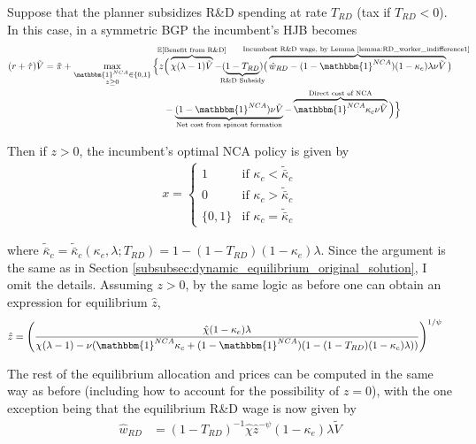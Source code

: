 \documentclass[11pt,english]{article}
\theoremstyle{definition}
\begin{document}
Suppose that the planner subsidizes R\&D spending at rate $T_{RD}$ (tax if $T_{RD} < 0$). In this case, in a symmetric BGP the incumbent's HJB becomes
\begin{align}
(r + \hat{\tau}) \tilde{V} = \tilde{\pi} + \max_{\substack{\mathbbm{1}^{NCA} \in \{0,1\} \\ z \ge 0}} \Big\{z &\Big( \overbrace{\chi (\lambda - 1) \tilde{V}}^{\mathclap{\mathbb{E}[\textrm{Benefit from R\&D}]}}- (\underbrace{1-T_{RD}}_{\mathclap{\text{R\&D Subsidy}}}) \big( \overbrace{\hat{w}_{RD} - (1-\mathbbm{1}^{NCA})(1-\kappa_e)\lambda \nu \tilde{V}}^{\mathclap{\text{Incumbent R\&D wage, by Lemma \ref{lemma:RD_worker_indifference1} }}}\big) \label{eq:hjb_incumbent_RDsubsidy} \nonumber \\ 
&-  \underbrace{(1-\mathbbm{1}^{NCA}) \nu \tilde{V}}_{\mathclap{\text{Net cost from spinout formation}}} - \overbrace{\mathbbm{1}^{NCA} \kappa_{c} \nu \tilde{V}}^{\mathclap{\text{Direct cost of NCA}}}\Big) \Big\} 
\end{align}

Then if $z > 0$, the incumbent's optimal NCA policy is given by 
\begin{align}
x = \begin{cases}
1 & \textrm{if } \kappa_{c} < \tilde{\bar{\kappa}}_c  \\
0 & \textrm{if } \kappa_{c} > \tilde{\bar{\kappa}}_c \\
\{0,1\} & \textrm{if } \kappa_c = \tilde{\bar{\kappa}}_c 
\end{cases} \label{eq:nca_policy_RDsubsidy}
\end{align}

where $\tilde{\bar{\kappa}}_c = \tilde{\bar{\kappa}}_c(\kappa_e,\lambda;T_{RD}) = 1 - (1-T_{RD})(1-\kappa_e)\lambda$. Since the argument is the same as in Section \ref{subsubsec:dynamic_equilibrium_original_solution}, I omit the details. Assuming $z > 0$, by the same logic as before one can obtain an expression for equilibrium $\hat{z}$, 
\begin{align}
\hat{z} &= \Bigg( \frac{\hat{\chi} (1-\kappa_{e}) \lambda}{\chi(\lambda -1) - \nu (\mathbbm{1}^{NCA}\kappa_c + (1-\mathbbm{1}^{NCA})(1 - (1-T_{RD})(1-\kappa_e)\lambda)) } \Bigg)^{1/\psi} \label{eq:effort_entrant_RDsubsidy}
\end{align}

The rest of the equilibrium allocation and prices can be computed in the same way as before (including how to account for the possibility of $z = 0$), with the one exception being that the equilibrium R\&D wage is now given by 
\begin{align}
\hat{w}_{RD} &= (1-T_{RD})^{-1}\hat{\chi} \hat{z}^{-\psi} (1-\kappa_e) \lambda \tilde{V} \label{eq:wage_rd_labor_RDsubsidy}
\end{align}
\end{document}
